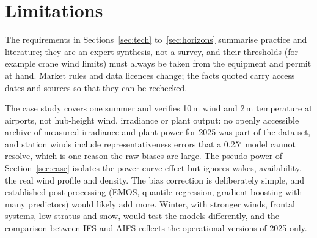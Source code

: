 \section{Limitations}
\label{sec:limits}

The requirements in Sections~\ref{sec:tech} to~\ref{sec:horizons} summarise practice and literature; they are an expert synthesis, not a survey, and their thresholds (for example crane wind limits) must always be taken from the equipment and permit at hand. Market rules and data licences change; the facts quoted carry access dates and sources so that they can be rechecked.

The case study covers one summer and verifies 10\,m wind and 2\,m temperature at airports, not hub-height wind, irradiance or plant output: no openly accessible archive of measured irradiance and plant power for 2025 was part of the data set, and station winds include representativeness errors that a 0.25$^\circ$ model cannot resolve, which is one reason the raw biases are large. The pseudo power of Section~\ref{sec:case} isolates the power-curve effect but ignores wakes, availability, the real wind profile and density. The bias correction is deliberately simple, and established post-processing (EMOS, quantile regression, gradient boosting with many predictors) would likely add more. Winter, with stronger winds, frontal systems, low stratus and snow, would test the models differently, and the comparison between IFS and AIFS reflects the operational versions of 2025 only.
